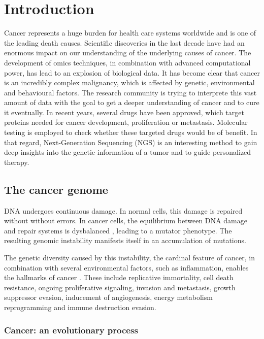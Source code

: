 \section{Introduction}

  Cancer represents a huge burden for health care systems worldwide and is one
  of the leading death causes. Scientific discoveries in the last decade have
  had an enormous impact on our understanding of the underlying causes of
  cancer. The development of omics techniques, in combination with advanced
  computational power, has lead to an explosion of biological data. It has
  become clear that cancer is an incredibly complex malignancy, which is
  affected by genetic, environmental and behavioural factors. The research
  community is trying to interprete this vast amount of data with the goal to
  get a deeper understanding of cancer and to cure it eventually. In recent
  years, several drugs have been approved, which target proteins needed for
  cancer development, proliferation or metastasis. Molecular testing is employed
  to check whether these targeted drugs would be of benefit. In that regard,
  Next-Generation Sequencing (NGS) is an interesting method to gain deep
  insights into the genetic information of a tumor and to guide personalized
  therapy.

  \subsection{The cancer genome}

    DNA undergoes continuous damage. In normal cells, this damage is repaired
    without without errors. In cancer cells, the equilibrium between DNA damage
    and repair systems is dysbalanced {\cite{dna_repair_epidemioloy}}, leading
    to a mutator phenotype. The resulting genomic instability manifests itself
    in an accumulation of mutations.

    The genetic diversity caused by this instability, the cardinal feature of
    cancer, in combination with several environmental factors, such as
    inflammation, enables the hallmarks of cancer {\cite{cancer_hallmarks}}.
    These include replicative immortality, cell death resistance, ongoing
    proliferative signaling, invasion and metastasis, growth suppressor evasion,
    inducement of angiogenesis, energy metabolism reprogramming and immune
    destruction evasion.

    \subsubsection{Cancer: an evolutionary process}

